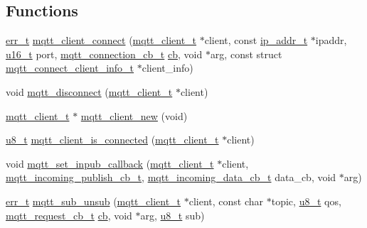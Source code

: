\subsection*{Functions}
\begin{DoxyCompactItemize}
\item 
\hyperlink{group__infrastructure__errors_gaf02d9da80fd66b4f986d2c53d7231ddb}{err\+\_\+t} \hyperlink{openmote-cc2538_2lwip_2src_2include_2lwip_2apps_2mqtt_8h_aaa9248041cdc76f3bf528c6434d83967}{mqtt\+\_\+client\+\_\+connect} (\hyperlink{structmqtt__client__t}{mqtt\+\_\+client\+\_\+t} $\ast$client, const \hyperlink{native_2lwip_2src_2include_2lwip_2ip__addr_8h_a88b43639738c4de2d3cd22e3a1fd7696}{ip\+\_\+addr\+\_\+t} $\ast$ipaddr, \hyperlink{group__compiler__abstraction_ga77570ac4fcab86864fa1916e55676da2}{u16\+\_\+t} port, \hyperlink{group__mqtt_ga8558743bdb7d599a93844fbc56c9029f}{mqtt\+\_\+connection\+\_\+cb\+\_\+t} \hyperlink{periph__rtt_2main_8c_afd4145001d494db2ea612e1239724148}{cb}, void $\ast$arg, const struct \hyperlink{structmqtt__connect__client__info__t}{mqtt\+\_\+connect\+\_\+client\+\_\+info\+\_\+t} $\ast$client\+\_\+info)
\item 
void \hyperlink{openmote-cc2538_2lwip_2src_2include_2lwip_2apps_2mqtt_8h_a73d8dd718bce09bfaab452770b4f76e6}{mqtt\+\_\+disconnect} (\hyperlink{structmqtt__client__t}{mqtt\+\_\+client\+\_\+t} $\ast$client)
\item 
\hyperlink{structmqtt__client__t}{mqtt\+\_\+client\+\_\+t} $\ast$ \hyperlink{openmote-cc2538_2lwip_2src_2include_2lwip_2apps_2mqtt_8h_ae7e19e236eb6122c8c39e93db6f5f53f}{mqtt\+\_\+client\+\_\+new} (void)
\item 
\hyperlink{group__compiler__abstraction_ga4caecabca98b43919dd11be1c0d4cd8e}{u8\+\_\+t} \hyperlink{openmote-cc2538_2lwip_2src_2include_2lwip_2apps_2mqtt_8h_a98f0fd168112b8b7db59bcd7a325a5c5}{mqtt\+\_\+client\+\_\+is\+\_\+connected} (\hyperlink{structmqtt__client__t}{mqtt\+\_\+client\+\_\+t} $\ast$client)
\item 
void \hyperlink{openmote-cc2538_2lwip_2src_2include_2lwip_2apps_2mqtt_8h_a1f165225a0aab027ba72b6077bc5dda0}{mqtt\+\_\+set\+\_\+inpub\+\_\+callback} (\hyperlink{structmqtt__client__t}{mqtt\+\_\+client\+\_\+t} $\ast$client, \hyperlink{group__mqtt_ga7116bb85255394cec4b1d9fa38842c29}{mqtt\+\_\+incoming\+\_\+publish\+\_\+cb\+\_\+t}, \hyperlink{group__mqtt_gafec7e75fe6a746eef9ca411463446c81}{mqtt\+\_\+incoming\+\_\+data\+\_\+cb\+\_\+t} data\+\_\+cb, void $\ast$arg)
\item 
\hyperlink{group__infrastructure__errors_gaf02d9da80fd66b4f986d2c53d7231ddb}{err\+\_\+t} \hyperlink{openmote-cc2538_2lwip_2src_2include_2lwip_2apps_2mqtt_8h_afdb39d4a9758f98c02451aaa9a9b3103}{mqtt\+\_\+sub\+\_\+unsub} (\hyperlink{structmqtt__client__t}{mqtt\+\_\+client\+\_\+t} $\ast$client, const char $\ast$topic, \hyperlink{group__compiler__abstraction_ga4caecabca98b43919dd11be1c0d4cd8e}{u8\+\_\+t} qos, \hyperlink{group__mqtt_gacad2bbe2cee76eaa120cc63e2f6094fd}{mqtt\+\_\+request\+\_\+cb\+\_\+t} \hyperlink{periph__rtt_2main_8c_afd4145001d494db2ea612e1239724148}{cb}, void $\ast$arg, \hyperlink{group__compiler__abstraction_ga4caecabca98b43919dd11be1c0d4cd8e}{u8\+\_\+t} sub)

\end{DoxyCompactItemize}
